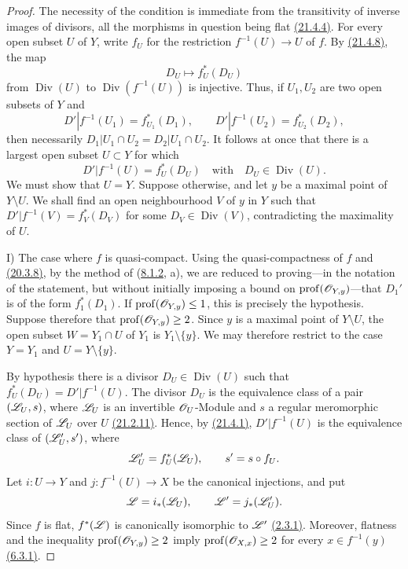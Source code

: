 \begin{proof}
The necessity of the condition is immediate from the transitivity of
inverse images of divisors, all the morphisms in question being flat
{\hyperref[IV.21.4.4]{(21.4.4)}}.  For every open subset $U$ of $Y$, write $f_U$ for the
restriction $f^{-1}(U)\to U$ of $f$.  By {\hyperref[IV.21.4.8]{(21.4.8)}}, the map
\[
 D_U\longmapsto f_U^*(D_U)
\]
from $\operatorname{Div}(U)$ to
$\operatorname{Div}(f^{-1}(U))$ is injective.  Thus, if $U_1,U_2$ are
two open subsets of $Y$ and
\[
 D'|f^{-1}(U_1)=f_{U_1}^*(D_1),\qquad
 D'|f^{-1}(U_2)=f_{U_2}^*(D_2),
\]
then necessarily
$D_1|U_1\cap U_2=D_2|U_1\cap U_2$.  It follows at once that there is a
largest open subset $U\subset Y$ for which
\[
 D'|f^{-1}(U)=f_U^*(D_U)
 \quad\text{with}\quad D_U\in\operatorname{Div}(U).
\]
We must show that $U=Y$.  Suppose otherwise, and let $y$ be a maximal
point of $Y\setminus U$.  We shall find an open neighbourhood $V$ of
$y$ in $Y$ such that
$D'|f^{-1}(V)=f_V^*(D_V)$ for some
$D_V\in\operatorname{Div}(V)$, contradicting the maximality of $U$.

\textup{I) The case where $f$ is quasi-compact.}
Using the quasi-compactness of $f$ and {\hyperref[IV.20]{(20.3.8)}}, by the method of
({\hyperref[IV.8.1.2]{8.1.2}}, a), we are reduced to proving---in the notation of the
statement, but without initially imposing a bound on
$\operatorname{prof}(\mathscr{O}_{Y,y})$---that $D_1'$ is of the form
$f_1^*(D_1)$.  If $\operatorname{prof}(\mathscr{O}_{Y,y})\leq 1$, this is
precisely the hypothesis.  Suppose therefore that
$\operatorname{prof}(\mathscr{O}_{Y,y})\geq 2$.  Since $y$ is a maximal
point of $Y\setminus U$, the open subset $W=Y_1\cap U$ of $Y_1$ is
$Y_1\setminus\{y\}$.  We may therefore restrict to the case
$Y=Y_1$ and $U=Y\setminus\{y\}$.

By hypothesis there is a divisor $D_U\in\operatorname{Div}(U)$ such
that $f_U^*(D_U)=D'|f^{-1}(U)$.  The divisor $D_U$ is the equivalence
class of a pair $(\mathscr{L}_U,s)$, where $\mathscr{L}_U$ is an invertible
$\mathscr{O}_U$-Module and $s$ a regular meromorphic section of $\mathscr{L}_U$
over $U$ {\hyperref[IV.21.2.11]{(21.2.11)}}.  Hence, by {\hyperref[IV.21.4.1]{(21.4.1)}}, $D'|f^{-1}(U)$ is the
equivalence class of $(\mathscr{L}'_U,s')$, where
\[
 \mathscr{L}'_U=f_U^*(\mathscr{L}_U),\qquad s'=s\circ f_U.
\]
Let $i:U\to Y$ and $j:f^{-1}(U)\to X$ be the canonical injections,
and put
\[
 \mathscr{L}=i_*(\mathscr{L}_U),\qquad
 \mathscr{L}'=j_*(\mathscr{L}'_U).
\]
Since $f$ is flat, $f^*(\mathscr{L})$ is canonically isomorphic to
$\mathscr{L}'$ {\hyperref[IV.2.3.1]{(2.3.1)}}.  Moreover, flatness and the inequality
$\operatorname{prof}(\mathscr{O}_{Y,y})\geq 2$ imply
$\operatorname{prof}(\mathscr{O}_{X,x})\geq 2$ for every
$x\in f^{-1}(y)$ {\hyperref[IV.6.3.1]{(6.3.1)}}.


\end{proof}
